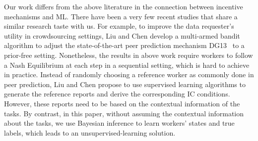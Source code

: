 Our work differs from the above literature in the connection between incentive mechanisms and ML. There have been a very few recent studies that share a similar research taste with us.
For example, to improve the data requester's utility in crowdsourcing settings, Liu and Chen \cite{liu2017sequential} develop a multi-armed bandit algorithm to adjust the state-of-the-art peer prediction mechanism DG13~\cite{dasgupta2013crowdsourced} to a prior-free setting. Nonetheless, the results in above work require workers to follow a Nash Equilibrium at each step in a sequential setting, which is hard to achieve in practice. Instead of randomly choosing a reference worker as commonly done in peer prediction, Liu and Chen \cite{liu2017machine} propose to use supervised learning algorithms to generate the reference reports and derive the corresponding IC conditions. However, these reports need to be based on the contextual information of the tasks.
By contrast, in this paper, without assuming the contextual information about the tasks, we use Bayesian inference to learn workers' states and true labels, which leads to an unsupervised-learning solution.



